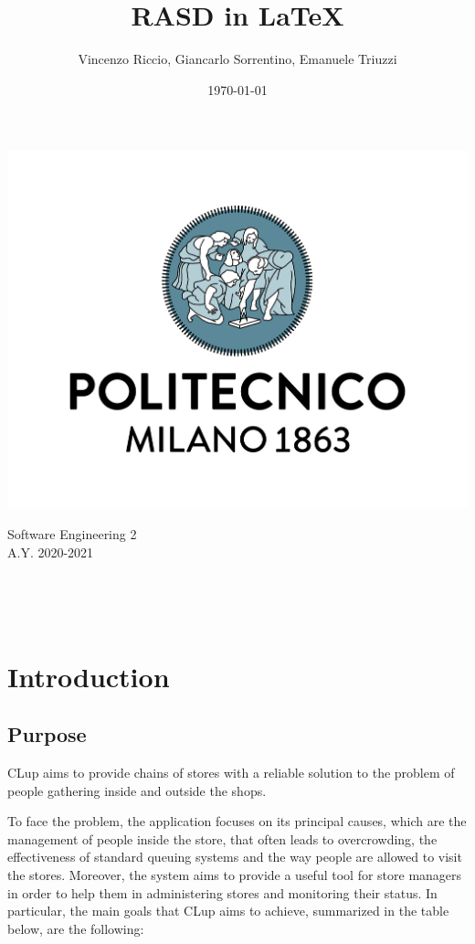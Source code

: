 \documentclass[a4paper,oneside,11pt]{book}   %
\title{RASD in \LaTeX}
\author{Vincenzo Riccio, Giancarlo Sorrentino, Emanuele Triuzzi}
\date{\today}
\begin{document}
\begin{titlingpage} %
    \begin{center}
        \includegraphics[height=0.52\linewidth]{pictures/polimi}\\ %
        \begin{large}
            Software Engineering 2 \\ %
            A.Y. 2020-2021\\
        \end{large}
        \vspace{4cm} %
        \begin{large} 
            \textbf{\thetitle} \\
        \end{large}
        \theauthor\\
        \vspace{8cm} %
        \thedate
    \end{center}
\end{titlingpage}

\newpage
{}
\tableofcontents
\newpage
{}



\chapter{Introduction}
    
    \section{Purpose}
    CLup aims to provide chains of stores with a reliable solution to the problem of people gathering inside and outside the shops. \par
    To face the problem, the application focuses on its principal causes, which are the management of people inside the store, that often leads to overcrowding, the effectiveness of standard queuing systems and the way people are allowed to visit the stores. Moreover, the system aims to provide a useful tool for store managers in order to help them in administering stores and monitoring their status. In particular, the main goals that CLup aims to achieve, summarized in the table below, are the following: 
\end{document}

